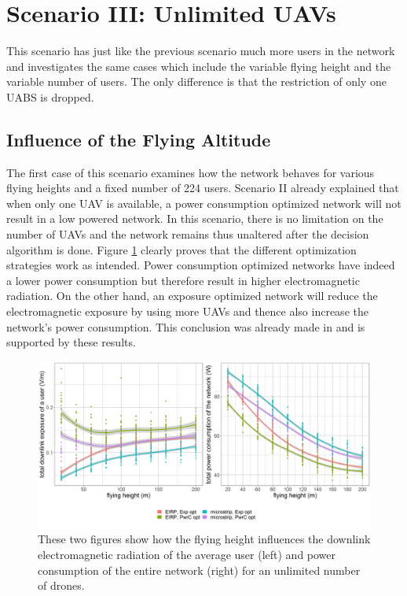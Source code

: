 \section{Scenario III: Unlimited \gls{UAV}s}
\label{s3}

This scenario has just like the previous scenario much more users in the network 
and investigates the same cases which include the variable flying height and the variable number of  users.
The only difference is that the restriction of only one \gls{UABS} is dropped.

\subsection{Influence of the Flying Altitude}
\label{S3A}

The first case of this scenario examines how the network behaves for various flying heights and a fixed number of 224 users.
Scenario II already explained that when only one \gls{UAV} is available, a power consumption optimized network will not result in a low 
powered network. In this scenario, there is no limitation on the number of \gls{UAV}s and the network remains thus unaltered after the decision 
algorithm is done. Figure \ref{fig:s3a_dlAndPc} clearly proves that the different optimization strategies work as intended.
Power consumption optimized networks have indeed a lower power consumption but therefore result in higher electromagnetic radiation.
On the other hand, an exposure optimized network will reduce the electromagnetic exposure by using more \gls{UAV}s and thence also increase the network's power consumption.
This conclusion was already made  in \cite{J1} and is supported by these results.

\begin{figure}[h!]
  \includegraphics[width=\textwidth]{../results/s3/fhvsdlAndPc.png}
  \caption{
    These two figures show how the flying height influences the downlink electromagnetic radiation of the average user (left) and 
  power consumption of the entire network (right) for an unlimited number of drones.
  }
     \label{fig:s3a_dlAndPc}
\end{figure}

